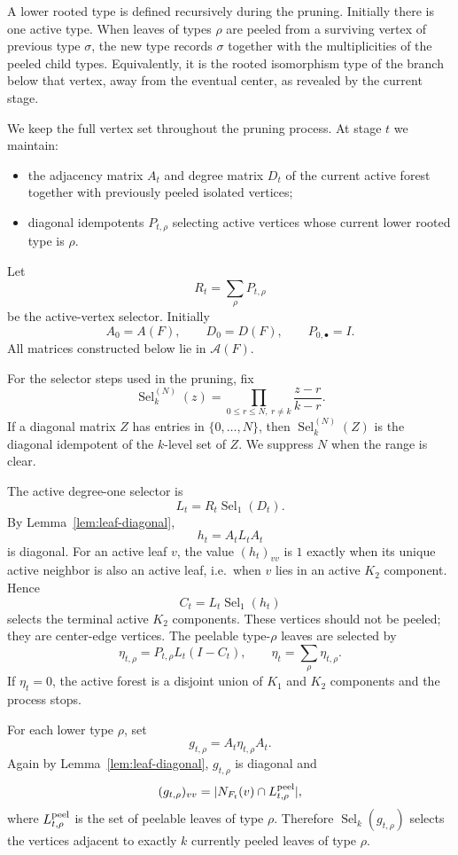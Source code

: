 \documentclass[a4paper,fleqn]{cas-sc}
\theoremstyle{definition}
\theoremstyle{remark}
\newcommand{\Aalg}{\mathcal A}
\newcommand{\Sel}{\operatorname{Sel}}
\begin{document}
A lower rooted type is defined recursively during the pruning.  Initially there is
one active type.  When leaves of types \(\rho\) are peeled from a surviving vertex
of previous type \(\sigma\), the new type records \(\sigma\) together with the
multiplicities of the peeled child types.  Equivalently, it is the rooted
isomorphism type of the branch below that vertex, away from the eventual center,
as revealed by the current stage.

We keep the full vertex set throughout the pruning process.  At stage \(t\) we
maintain:
\begin{itemize}[leftmargin=2em]
    \item the adjacency matrix \(A_t\) and degree matrix \(D_t\) of the current active
    forest together with previously peeled isolated vertices;
    \item diagonal idempotents \(P_{t,\rho}\) selecting active vertices whose
    current lower rooted type is \(\rho\).
\end{itemize}
Let
\[
        R_t=\sum_\rho P_{t,\rho}
\]
be the active-vertex selector.  Initially
\[
        A_0=A(F),\qquad D_0=D(F),\qquad P_{0,\bullet}=I.
\]
All matrices constructed below lie in \(\Aalg(F)\).

For the selector steps used in the pruning, fix
\[
        \Sel_k^{(N)}(z)=\prod_{0\le r\le N,\ r\ne k}\frac{z-r}{k-r}.
\]
If a diagonal matrix \(Z\) has entries in \(\{0,\ldots,N\}\), then
\(\Sel_k^{(N)}(Z)\) is the diagonal idempotent of the \(k\)-level set of \(Z\).  We
suppress \(N\) when the range is clear.

The active degree-one selector is
\[
        L_t=R_t\Sel_1(D_t).
\]
By Lemma~\ref{lem:leaf-diagonal},
\[
        h_t=A_tL_tA_t
\]
is diagonal.  For an active leaf \(v\), the value \((h_t)_{vv}\) is \(1\) exactly when
its unique active neighbor is also an active leaf, i.e.\ when \(v\) lies in an
active \(K_2\) component.  Hence
\[
        C_t=L_t\Sel_1(h_t)
\]
selects the terminal active \(K_2\) components.  These vertices should not be
peeled; they are center-edge vertices.  The peelable type-\(\rho\) leaves are
selected by
\[
        \eta_{t,\rho}=P_{t,\rho}L_t(I-C_t),
        \qquad
        \eta_t=\sum_\rho \eta_{t,\rho}.
\]
If \(\eta_t=0\), the active forest is a disjoint union of \(K_1\) and \(K_2\)
components and the process stops.

For each lower type \(\rho\), set
\[
        g_{t,\rho}=A_t\eta_{t,\rho}A_t.
\]
Again by Lemma~\ref{lem:leaf-diagonal}, \(g_{t,\rho}\) is diagonal and
\[
        (g_{t,\rho})_{vv}=|N_{F_t}(v)\cap L_{t,\rho}^{\rm peel}|,
\]
where \(L_{t,\rho}^{\rm peel}\) is the set of peelable leaves of type \(\rho\).
Therefore \(\Sel_k(g_{t,\rho})\) selects the vertices adjacent to exactly \(k\)
currently peeled leaves of type \(\rho\).
\end{document}
